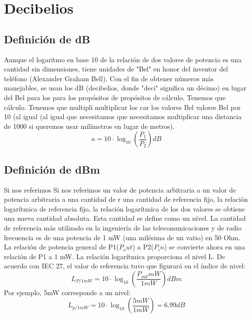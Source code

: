 \documentclass[
	11pt, %
	fleqn, %
	a4paper, %
]{LegrandOrangeBook}
\begin{document}
\chapter{Decibelios}
\section{Definición de dB}
Aunque el logaritmo en base 10 de la relación de dos valores de potencia es una cantidad sin dimensiones, tiene unidades de "Bel" en honor del inventor del teléfono (Alexander Graham Bell). Con el fin de obtener números más manejables, se usan los dB (decibelios, donde "deci" significa un décimo) en lugar del Bel  para los  para los propósitos de propósitos de cálculo. Tenemos que cálculo. Tenemos que multipli multiplicar los car los valores Bel valores Bel por 10 (al igual (al igual que necesitamos que necesitamos multiplicar una distancia de 1000 si queremos usar milímetros en lugar de metros).
\begin{equation}
\label{art:decibel}
a=10\cdot \log_{10}\left(\frac{P_1}{P_2}\right)dB
\end{equation}
\section{Definición de dBm}
Si nos referimos Si nos referimos un valor de potencia arbitraria a un valor de potencia arbitraria a una cantidad de r una cantidad de referencia fijo, la relación logarítmica de referencia fijo, la relación logarítmica de los dos valores se obtiene una nueva cantidad absoluta. Esta cantidad se define como un nivel. La cantidad de referencia más utilizado en la ingeniería de las telecomunicaciones y de radio frecuencia es de una potencia de 1 mW (una milésima de un vatio) en 50 Ohm. La relación de potencia general de P1($P_out$) a P2($P_in$) se convierte ahora en una relación de P1 a 1 mW. La relación logarítmica proporciona el nivel L. De acuerdo con IEC 27, el valor de referencia tuvo que figurará en el índice de nivel:
\begin{equation}
\label{art:dbm}
L_{P/1mW}=10\cdot \log_{10}\left(\frac{P_{out}mW}{1mW}\right)dBm
\end{equation}
Por ejemplo, 5mW corresponde a un nivel:
\begin{displaymath}
L_{p/1mW}=10\cdot \log_{10}\left(\frac{5mW}{1mW}\right)=6.99dB
\end{displaymath}
\end{document}
